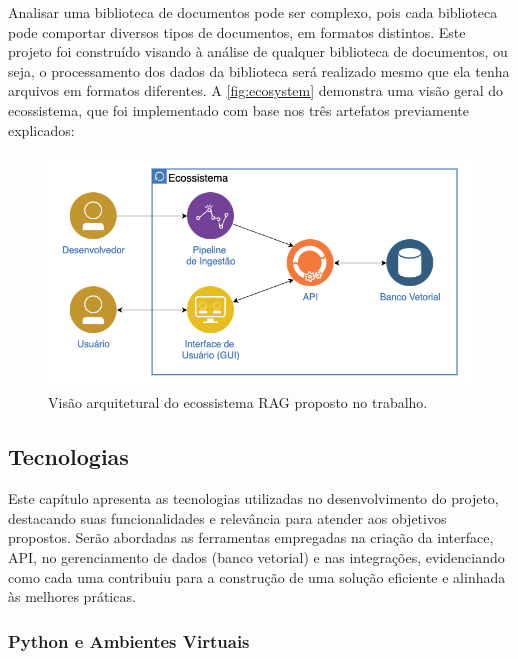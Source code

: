 \documentclass[a4paper, 12pt]{article}
\begin{document}
    Analisar uma biblioteca de documentos pode ser complexo, pois cada biblioteca pode comportar diversos tipos de documentos, em formatos distintos. Este projeto foi construído visando à análise de qualquer biblioteca de documentos, ou seja, o processamento dos dados da biblioteca será realizado mesmo que ela tenha arquivos em formatos diferentes. A \autoref{fig:ecosystem} demonstra uma visão geral do ecossistema, que foi implementado com base nos três artefatos previamente explicados:

    \begin{figure}[ht]
        \includegraphics[width=\textwidth,height=0.9\textheight,keepaspectratio]{ecosystem.png}
        \centering
        \caption{Visão arquitetural do ecossistema RAG proposto no trabalho.}
        \centering
        \label{fig:ecosystem}
    \end{figure}

    \subsection{Tecnologias} \label{sec:technologies}

    Este capítulo apresenta as tecnologias utilizadas no desenvolvimento do projeto, destacando suas funcionalidades e relevância para atender aos objetivos propostos. Serão abordadas as ferramentas empregadas na criação da interface, API, no gerenciamento de dados (banco vetorial) e nas integrações, evidenciando como cada uma contribuiu para a construção de uma solução eficiente e alinhada às melhores práticas.

    \subsubsection{Python e Ambientes Virtuais} \label{sec:python}
    
\end{document}
